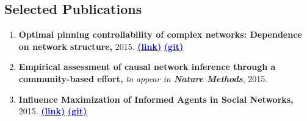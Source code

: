 \documentclass[letter]{res}
\begin{document}
\begin{resume}
\section{Selected Publications}
\begin{enumerate}
\item \textbf{Optimal pinning controllability of complex networks: Dependence on network structure,} 2015.
\href{http://link.aps.org/doi/10.1103/PhysRevE.91.012803}{\textbf{\textcolor{blue}{(link)}}}
{\href{https://github.com/omid55/optimal_pinning_control}{\textbf{\textcolor{blue}{(git)}}}}

\item \textbf{Empirical assessment of causal network inference through a community-based effort,} \textit{to appear in \textbf{Nature Methods}}, 2015.

\item \textbf{Influence Maximization of Informed Agents in Social Networks,} 2015.
{\href{http://dx.doi.org/10.1016/j.amc.2014.12.139}{\textbf{\textcolor{blue}{(link)}}}}
{\href{https://github.com/omid55/influence_maximization}{\textbf{\textcolor{blue}{(git)}}}}


\end{enumerate}
\end{resume}
\end{document}
